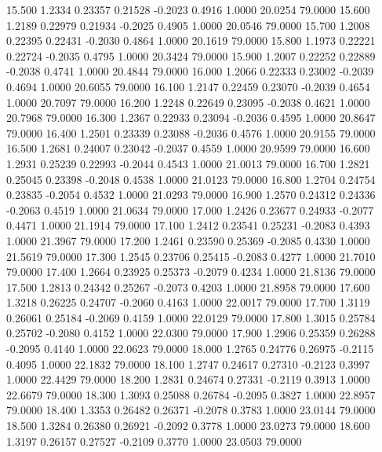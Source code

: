   15.500   1.2334   0.23357   0.21528  -0.2023   0.4916   1.0000  20.0254  79.0000
  15.600   1.2189   0.22979   0.21934  -0.2025   0.4905   1.0000  20.0546  79.0000
  15.700   1.2008   0.22395   0.22431  -0.2030   0.4864   1.0000  20.1619  79.0000
  15.800   1.1973   0.22221   0.22724  -0.2035   0.4795   1.0000  20.3424  79.0000
  15.900   1.2007   0.22252   0.22889  -0.2038   0.4741   1.0000  20.4844  79.0000
  16.000   1.2066   0.22333   0.23002  -0.2039   0.4694   1.0000  20.6055  79.0000
  16.100   1.2147   0.22459   0.23070  -0.2039   0.4654   1.0000  20.7097  79.0000
  16.200   1.2248   0.22649   0.23095  -0.2038   0.4621   1.0000  20.7968  79.0000
  16.300   1.2367   0.22933   0.23094  -0.2036   0.4595   1.0000  20.8647  79.0000
  16.400   1.2501   0.23339   0.23088  -0.2036   0.4576   1.0000  20.9155  79.0000
  16.500   1.2681   0.24007   0.23042  -0.2037   0.4559   1.0000  20.9599  79.0000
  16.600   1.2931   0.25239   0.22993  -0.2044   0.4543   1.0000  21.0013  79.0000
  16.700   1.2821   0.25045   0.23398  -0.2048   0.4538   1.0000  21.0123  79.0000
  16.800   1.2704   0.24754   0.23835  -0.2054   0.4532   1.0000  21.0293  79.0000
  16.900   1.2570   0.24312   0.24336  -0.2063   0.4519   1.0000  21.0634  79.0000
  17.000   1.2426   0.23677   0.24933  -0.2077   0.4471   1.0000  21.1914  79.0000
  17.100   1.2412   0.23541   0.25231  -0.2083   0.4393   1.0000  21.3967  79.0000
  17.200   1.2461   0.23590   0.25369  -0.2085   0.4330   1.0000  21.5619  79.0000
  17.300   1.2545   0.23706   0.25415  -0.2083   0.4277   1.0000  21.7010  79.0000
  17.400   1.2664   0.23925   0.25373  -0.2079   0.4234   1.0000  21.8136  79.0000
  17.500   1.2813   0.24342   0.25267  -0.2073   0.4203   1.0000  21.8958  79.0000
  17.600   1.3218   0.26225   0.24707  -0.2060   0.4163   1.0000  22.0017  79.0000
  17.700   1.3119   0.26061   0.25184  -0.2069   0.4159   1.0000  22.0129  79.0000
  17.800   1.3015   0.25784   0.25702  -0.2080   0.4152   1.0000  22.0300  79.0000
  17.900   1.2906   0.25359   0.26288  -0.2095   0.4140   1.0000  22.0623  79.0000
  18.000   1.2765   0.24776   0.26975  -0.2115   0.4095   1.0000  22.1832  79.0000
  18.100   1.2747   0.24617   0.27310  -0.2123   0.3997   1.0000  22.4429  79.0000
  18.200   1.2831   0.24674   0.27331  -0.2119   0.3913   1.0000  22.6679  79.0000
  18.300   1.3093   0.25088   0.26784  -0.2095   0.3827   1.0000  22.8957  79.0000
  18.400   1.3353   0.26482   0.26371  -0.2078   0.3783   1.0000  23.0144  79.0000
  18.500   1.3284   0.26380   0.26921  -0.2092   0.3778   1.0000  23.0273  79.0000
  18.600   1.3197   0.26157   0.27527  -0.2109   0.3770   1.0000  23.0503  79.0000
